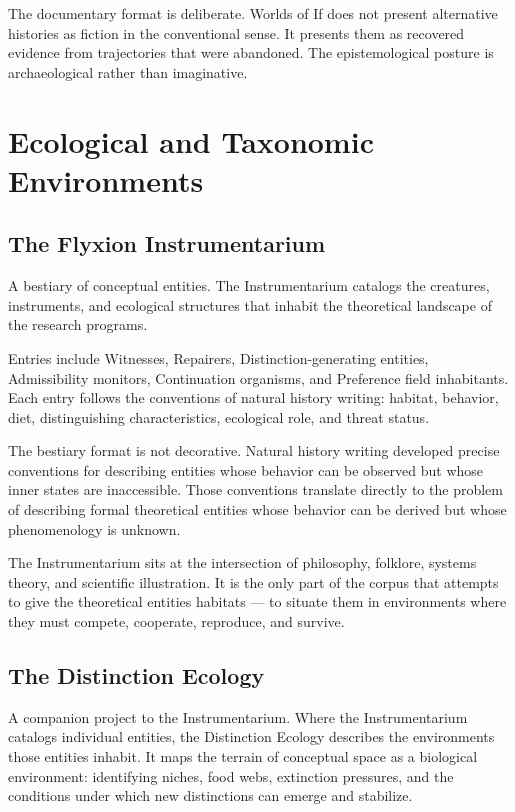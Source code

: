 \documentclass[12pt, openany]{book}
\begin{document}
The documentary format is deliberate. Worlds of If does not present
alternative histories as fiction in the conventional sense. It presents
them as recovered evidence from trajectories that were abandoned. The
epistemological posture is archaeological rather than imaginative.

\section{Ecological and Taxonomic Environments}

\subsection{The Flyxion Instrumentarium} A bestiary of conceptual entities.
The Instrumentarium catalogs the creatures, instruments, and ecological
structures that inhabit the theoretical landscape of the research programs.

Entries include Witnesses, Repairers, Distinction-generating entities,
Admissibility monitors, Continuation organisms, and Preference field
inhabitants. Each entry follows the conventions of natural history writing:
habitat, behavior, diet, distinguishing characteristics, ecological role,
and threat status.

The bestiary format is not decorative. Natural history writing developed
precise conventions for describing entities whose behavior can be observed
but whose inner states are inaccessible. Those conventions translate
directly to the problem of describing formal theoretical entities whose
behavior can be derived but whose phenomenology is unknown.

The Instrumentarium sits at the intersection of philosophy, folklore,
systems theory, and scientific illustration. It is the only part of the
corpus that attempts to give the theoretical entities habitats — to
situate them in environments where they must compete, cooperate, reproduce,
and survive.

\subsection{The Distinction Ecology} A companion project to the
Instrumentarium. Where the Instrumentarium catalogs individual entities,
the Distinction Ecology describes the environments those entities inhabit.
It maps the terrain of conceptual space as a biological environment:
identifying niches, food webs, extinction pressures, and the conditions
under which new distinctions can emerge and stabilize.
\end{document}
